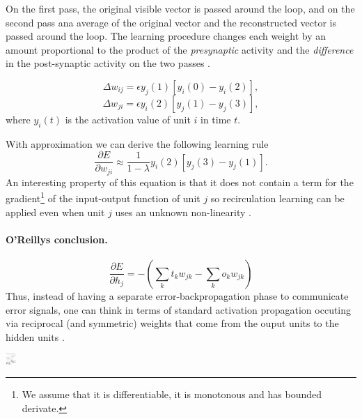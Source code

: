 On the first pass, the original visible vector is passed around the loop, and on the second pass ana average of the original vector and the reconstructed vector is passed around the loop. The learning procedure changes each weight by an amount proportional to the product of the \textit{presynaptic} activity and the \textit{difference} in the post-synaptic activity on the two passes  \citet{hinton1988learning}.

$$\Delta w_{ij} = \epsilon y_j(1)[y_i(0)-y_i(2)],$$
$$\Delta w_{ji} = \epsilon y_i(2)[y_j(1)-y_j(3)],$$
where $y_i(t)$ is the activation value of unit $i$ in time $t$.

With approximation we can derive the following learning rule
$$\frac{\partial E}{\partial w_{ji}} \approx \frac{1}{1-\lambda}y_i(2)[y_j(3)-y_j(1)].$$
An interesting property of this equation is that it does not contain a term for the gradient\footnote{We assume that it is differentiable, it is monotonous and has bounded derivate.} of the input-output function of unit $j$ so recirculation learning can be applied even when unit $j$ uses an unknown non-linearity \citet{hinton1988learning}. 



\paragraph{O'Reillys conclusion.}

$$\frac{\partial E}{\partial h_j} = - (\sum_k t_k w_{jk} - \sum_k o_k w_{jk})$$
Thus, instead of having a separate error-backpropagation phase to communicate error signals, one can think in terms of standard activation propagation occuting via reciprocal (and symmetric) weights that come from the ouput units to the hidden units \citet{o1996bio}. 

\includegraphics[width=15px]{img/recirculation.png}
